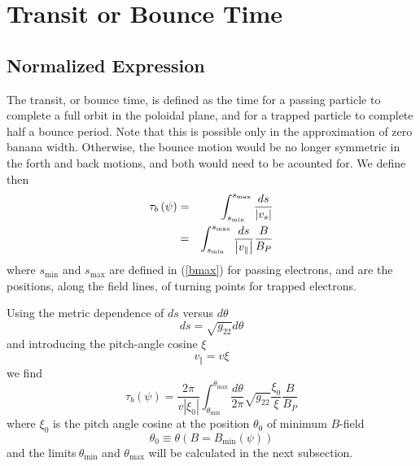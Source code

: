 \documentclass{article}
\begin{document}
\section{Transit or Bounce Time}

\subsection{Normalized Expression}

The transit, or bounce time, is defined as the time for a passing particle
to complete a full orbit in the poloidal plane, and for a trapped particle
to complete half a bounce period. Note that this is possible only in the
approximation of zero banana width. Otherwise, the bounce motion would be no
longer symmetric in the forth and back motions, and both would need to be
acounted for. We define then 
\begin{eqnarray}
\tau _{b}\left( \psi \right) &=&\int_{s_{\min }}^{s_{\max }}\frac{ds}{\left|
v_{s}\right| } \\
&=&\int_{s_{\min }}^{s_{\max }}\frac{ds}{\left| v_{\Vert }\right| }\frac{B}{%
B_{P}}
\end{eqnarray}
where $s_{\min }$ and $s_{\max }$ are defined in (\ref{bmax}) for passing
electrons, and are the positions, along the field lines, of turning points
for trapped electrons.

Using the metric dependence of $ds$ versus $d\theta $%
\begin{equation}
ds=\sqrt{g_{22}}d\theta
\end{equation}
and introducing the pitch-angle cosine $\xi $%
\begin{equation}
v_{\Vert }=v\xi
\end{equation}
we find 
\begin{equation}
\tau _{b}\left( \psi \right) =\frac{2\pi }{v\left| \xi _{0}\right| }%
\int_{\theta _{\min }}^{\theta _{\max }}\frac{d\theta }{2\pi }\sqrt{g_{22}}%
\frac{\xi _{0}}{\xi }\frac{B}{B_{P}}
\end{equation}
where $\xi _{0}$ is the pitch angle cosine at the position $\theta _{0}$ of
minimum $B$-field 
\begin{equation}
\theta _{0}\equiv \theta \left( B=B_{\min }\left( \psi \right) \right)
\end{equation}
and the limits$\ \theta _{\min }$ and $\theta _{\max }$ will be calculated
in the next subsection.
\end{document}
